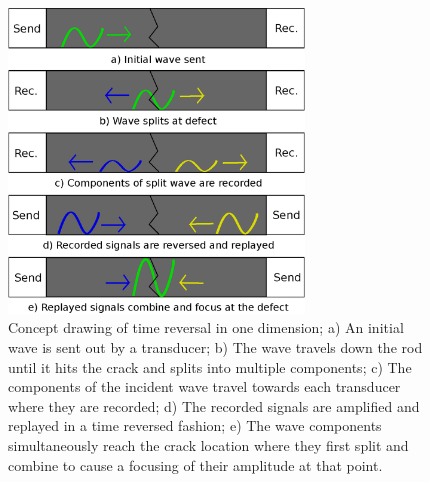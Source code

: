 \begin{figure}[ht!]
\centering
\includegraphics[width=0.7\textwidth]{eps_pics/trDrawing}
\caption{ Concept drawing of time reversal in one dimension; a) An initial wave is sent out by a transducer; b) The wave travels down the rod until it hits the crack and splits into multiple components; c) The components of the incident wave travel towards each transducer where they are recorded; d) The recorded signals are amplified and replayed in a time reversed fashion; e) The wave components simultaneously reach the crack location where they first split and combine to cause a focusing of their amplitude at that point.
	 \label{fig:trDrawing}} 
\end{figure}

